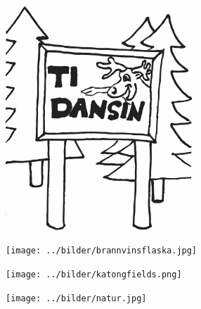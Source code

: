 %

\begin{intersong}
\sffamily\bfseries\LARGE{}
	\includegraphics[width=7cm]{../bilder/fardigabilder/BilderTillKapitel/tidansin.png} 
\end{intersong}
\sclearpage

\sclearpage

\sclearpage

\sclearpage

\begin{intersong}
\begin{center}
\texttt{[image: ../bilder/brannvinsflaska.jpg]} 
\end{center}
\end{intersong}
\sclearpage

\sclearpage

\begin{intersong}
\begin{center}
\texttt{[image: ../bilder/katongfields.png]} 
\end{center}
\end{intersong}

\begin{intersong}
\begin{center}
\texttt{[image: ../bilder/natur.jpg]} 
\end{center}
\end{intersong}
\sclearpage

\sclearpage

\sclearpage

\sclearpage

%